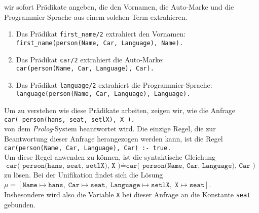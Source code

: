 wir sofort Pr\"{a}dikate angeben, 
die den Vornamen, die Auto-Marke und die Programmier-Sprache aus einem solchen Term
extrahieren.
\begin{enumerate}
\item Das Pr\"{a}dikat \texttt{first\_name/2} extrahiert den Vornamen: \\[0.2cm]
      \hspace*{1.3cm} \texttt{first\_name(person(Name, Car, Language), Name).}
\item Das Pr\"{a}dikat \texttt{car/2} extrahiert die Auto-Marke: \\[0.2cm]
      \hspace*{1.3cm} \texttt{car(person(Name, Car, Language), Car).}
\item Das Pr\"{a}dikat \texttt{language/2} extrahiert die Programmier-Sprache: \\[0.2cm]
      \hspace*{1.3cm} \texttt{language(person(Name, Car, Language), Language).}
\end{enumerate}
Um zu verstehen wie diese Pr\"{a}dikate arbeiten, zeigen wir, wie die Anfrage \\[0.2cm]
\hspace*{1.3cm} \texttt{car( person(hans, seat, setlX), X ).}\\[0.2cm]
von dem \textsl{Prolog}-System beantwortet wird.  Die einzige Regel, die zur Beantwortung
dieser Anfrage herangezogen werden kann, ist die Regel \\[0.2cm]
\hspace*{1.3cm} \texttt{car(person(Name, Car, Language), Car) :- true.} \\[0.2cm]
Um diese Regel anwenden zu k\"{o}nnen, ist die syntaktische Gleichung \\[0.2cm]
\hspace*{1.3cm} 
$\texttt{car( person(hans, seat, setlX), X )} \doteq \texttt{car( person(Name, Car, Language), Car )}$
\\[0.2cm]
zu l\"{o}sen.  Bei der Unifikation findet sich die L\"{o}sung \\[0.2cm]
\hspace*{1.3cm} 
$\mu = [ \texttt{Name} \mapsto \texttt{hans},\; \texttt{Car} \mapsto \texttt{seat},\;\texttt{Language} \mapsto \texttt{setlX},\; \texttt{X} \mapsto \texttt{seat}]$.
\\[0.2cm]
Insbesondere wird also die Variable \texttt{X} bei dieser Anfrage an die Konstante
\texttt{seat} gebunden.

